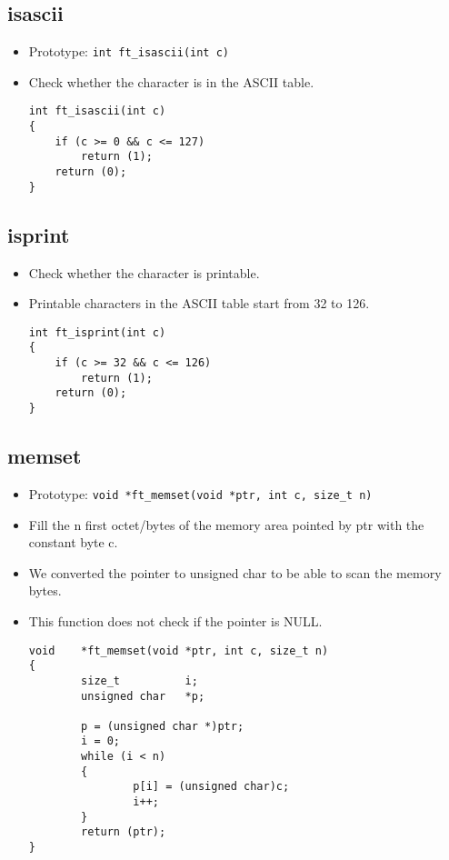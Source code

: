 \documentclass{article}
\begin{document}
		\subsection{isascii}
			\begin{itemize}[label=$\rightarrow$]
				\item Prototype: \texttt{int	ft\_isascii(int c)}
				\item Check whether the character is in the ASCII table.
				\begin{verbatim}
int	ft_isascii(int c)
{
	if (c >= 0 && c <= 127)
		return (1);
	return (0);
}
				\end{verbatim}
			\end{itemize}
		
		\subsection{isprint}
			\begin{itemize}[label=$\rightarrow$]
				\item Check whether the character is printable.
				\item Printable characters in the ASCII table start from 32 to 126.
				\begin{verbatim}
int	ft_isprint(int c)
{
	if (c >= 32 && c <= 126)
		return (1);
	return (0);
}
				\end{verbatim}
			\end{itemize}
		
		\subsection{memset}
			\begin{itemize}[label=$\rightarrow$]
				\item Prototype: \texttt{void    *ft\_memset(void *ptr, int c, size\_t n)}
				\item Fill the n first octet/bytes of the memory area pointed by ptr with the constant byte c.
				\item We converted the pointer to unsigned char to be able to scan the memory bytes.
				\item This function does not check if the pointer is NULL.
				\begin{verbatim}
void    *ft_memset(void *ptr, int c, size_t n)
{
        size_t          i;
        unsigned char   *p;

        p = (unsigned char *)ptr;
        i = 0;
        while (i < n)
        {
                p[i] = (unsigned char)c;
                i++;
        }
        return (ptr);
}
				\end{verbatim}
			\end{itemize}
		
\end{document}
